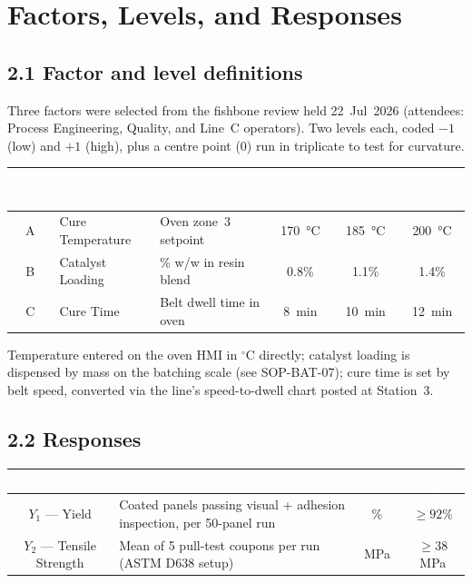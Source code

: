 \section{Factors, Levels, and Responses}

\subsection*{2.1 Factor and level definitions}
Three factors were selected from the fishbone review held 22~Jul~2026 (attendees: Process
Engineering, Quality, and Line~C operators). Two levels each, coded \(-1\) (low) and \(+1\)
(high), plus a centre point (\(0\)) run in triplicate to test for curvature.

\vspace{0.4em}
\noindent\begin{tabularx}{\linewidth}{@{}c l Y c c c@{}}
\toprule
{}
\textcolor{white}{\textbf{Code}} & \textcolor{white}{\textbf{Factor}} & \textcolor{white}{\textbf{Description}} &
\textcolor{white}{\textbf{Low (\(-1\))}} & \textcolor{white}{\textbf{Centre (\(0\))}} & \textcolor{white}{\textbf{High (\(+1\))}} \\
\midrule
A & Cure Temperature & Oven zone~3 setpoint & \SI{170}{\celsius} & \SI{185}{\celsius} & \SI{200}{\celsius} \\
B & Catalyst Loading & \% w/w in resin blend & 0.8\% & 1.1\% & 1.4\% \\
C & Cure Time & Belt dwell time in oven & 8~min & 10~min & 12~min \\
\bottomrule
\end{tabularx}

\begin{notebox}
Temperature entered on the oven HMI in \(^{\circ}\)C directly; catalyst loading is dispensed by
mass on the batching scale (see SOP-BAT-07); cure time is set by belt speed, converted via the
line's speed-to-dwell chart posted at Station~3.
\end{notebox}

\subsection*{2.2 Responses}
\noindent\begin{tabularx}{\linewidth}{@{}c Y c c@{}}
\toprule
{}
\textcolor{white}{\textbf{Response}} & \textcolor{white}{\textbf{Definition}} & \textcolor{white}{\textbf{Units}} & \textcolor{white}{\textbf{Target}} \\
\midrule
\(Y_1\) --- Yield & Coated panels passing visual + adhesion inspection, per 50-panel run & \% & \(\geq 92\%\) \\
\(Y_2\) --- Tensile Strength & Mean of 5 pull-test coupons per run (ASTM D638 setup) & MPa & \(\geq 38\) MPa \\
\bottomrule
\end{tabularx}

